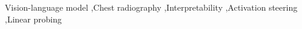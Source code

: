 Vision-language model \sep Chest radiography \sep Interpretability \sep Activation steering \sep Linear probing
